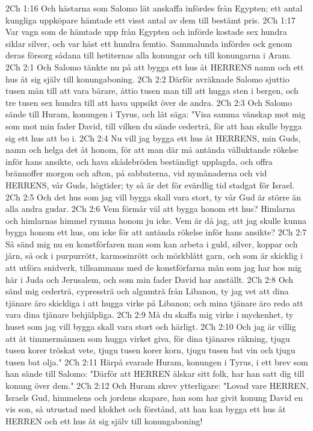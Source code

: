 2Ch 1:16  Och hästarna som Salomo lät anskaffa infördes från Egypten; ett antal kungliga uppköpare hämtade ett visst antal av dem till bestämt pris.
2Ch 1:17  Var vagn som de hämtade upp från Egypten och införde kostade sex hundra siklar silver, och var häst ett hundra femtio. Sammalunda infördes ock genom deras försorg sådana till hetiternas alla konungar och till konungarna i Aram.
2Ch 2:1  Och Salomo tänkte nu på att bygga ett hus åt HERRENS namn och ett hus åt sig själv till konungaboning.
2Ch 2:2  Därför avräknade Salomo sjuttio tusen män till att vara bärare, åttio tusen man till att hugga sten i bergen, och tre tusen sex hundra till att hava uppsikt över de andra.
2Ch 2:3  Och Salomo sände till Huram, konungen i Tyrus, och lät säga: "Visa samma vänskap mot mig som mot min fader David, till vilken du sände cederträ, för att han skulle bygga sig ett hus att bo i.
2Ch 2:4  Nu vill jag bygga ett hus åt HERRENS, min Guds, namn och helga det åt honom, för att man där må antända välluktande rökelse inför hans ansikte, och hava skådebröden beständigt upplagda, och offra brännoffer morgon och afton, på sabbaterna, vid nymånaderna och vid HERRENS, vår Guds, högtider; ty så är det för evärdlig tid stadgat för Israel.
2Ch 2:5  Och det hus som jag vill bygga skall vara stort, ty vår Gud är större än alla andra gudar.
2Ch 2:6  Vem förmår väl att bygga honom ett hus? Himlarna och himlarnas himmel rymma honom ju icke. Vem är då jag, att jag skulle kunna bygga honom ett hus, om icke för att antända rökelse inför hans ansikte?
2Ch 2:7  Så sänd mig nu en konstförfaren man som kan arbeta i guld, silver, koppar och järn, så ock i purpurrött, karmosinrött och mörkblått garn, och som är skicklig i att utföra snidverk, tillsammans med de konstförfarna män som jag har hos mig här i Juda och Jerusalem, och som min fader David har anställt.
2Ch 2:8  Och sänd mig cederträ, cypressträ och algumträ från Libanon, ty jag vet att dina tjänare äro skickliga i att hugga virke på Libanon; och mina tjänare äro redo att vara dina tjänare behjälpliga.
2Ch 2:9  Må du skaffa mig virke i myckenhet, ty huset som jag vill bygga skall vara stort och härligt.
2Ch 2:10  Och jag är villig att åt timmermännen som hugga virket giva, för dina tjänares räkning, tjugu tusen korer tröskat vete, tjugu tusen korer korn, tjugu tusen bat vin och tjugu tusen bat olja."
2Ch 2:11  Härpå svarade Huram, konungen i Tyrus, i ett brev som han sände till Salomo: "Därför att HERREN älskar sitt folk, har han satt dig till konung över dem."
2Ch 2:12  Och Huram skrev ytterligare: "Lovad vare HERREN, Israels Gud, himmelens och jordens skapare, han som har givit konung David en vis son, så utrustad med klokhet och förstånd, att han kan bygga ett hus åt HERREN och ett hus åt sig själv till konungaboning!
